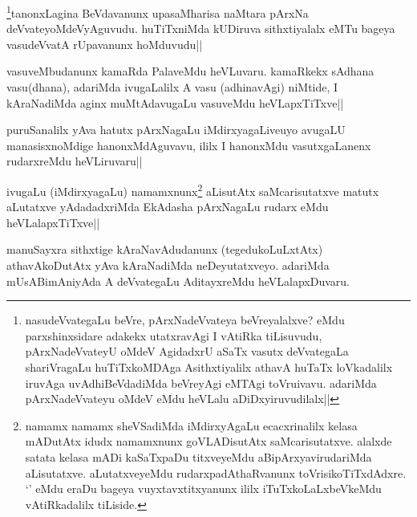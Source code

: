 \begin{artha}
\footnote[2]{nasudeVvategaLu beVre, pArxNadeVvateya beVreyalalxve? eMdu parxshinxsidare adakekx utatxravAgi I vAtiRka tiLisuvudu, pArxNadeVvateyU oMdeV AgidadxrU aSaTx vasutx deVvategaLa shariVragaLu huTiTxkoMDAga Asithxtiyalilx athavA huTaTx loVkadalilx iruvAga uvAdhiBeVdadiMda beVreyAgi eMTAgi toVruivavu. adariMda pArxNadeVvateyu oMdeV eMdu heVLalu aDiDxyiruvudilalx||}tanonxLagina BeVdavanunx upasaMharisa naMtara pArxNa deVvateyoMdeVyAguvudu. huTiTxniMda kUDiruva sithxtiyalalx eMTu bageya vasudeVvatA rUpavanunx hoMduvudu||
\end{artha}


\begin{artha}
vasuveMbudanunx kamaRda PalaveMdu heVLuvaru. kamaRkekx sAdhana vasu(dhana), adariMda ivugaLalilx A vasu (adhinavAgi) niMtide, I kAraNadiMda aginx muMtAdavugaLu vasuveMdu heVLapxTiTxve||
\end{artha}


\begin{artha}
puruSanalilx yAva hatutx pArxNagaLu iMdirxyagaLiveuyo avugaLU manasisxnoMdige hanonxMdAguvavu, ililx I hanonxMdu vasutxgaLanenx rudarxreMdu heVLiruvaru||
\end{artha}


\begin{artha}
ivugaLu (iMdirxyagaLu) namamxnunx\footnote[1]{namamx namamx sheVSadiMda iMdirxyAgaLu ecacxrinalilx kelasa mADutAtx idudx namamxnunx goVLADisutAtx saMcarisutatxve. alalxde satata kelasa mADi kaSaTxpaDu titxveyeMdu aBipArxyavirudariMda aLisutatxve. aLutatxveyeMdu rudarxpadAthaRvanunx toVrisikoTiTxdAdxre. `\stext ' eMdu eraDu bageya vuyxtavxtitxyanunx ililx iTuTxkoLaLxbeVkeMdu vAtiRkadalilx tiLiside.} aLisutAtx saMcarisutatxve matutx aLutatxve yAdadadxriMda EkAdasha pArxNagaLu rudarx eMdu heVLalapxTiTxve||
\end{artha}


\begin{artha}
manuSayxra sithxtige kAraNavAdudanunx (tegedukoLuLxtAtx) athavAkoDutAtx yAva kAraNadiMda neDeyutatxveyo. adariMda mUsABimAniyAda A deVvategaLu AditayxreMdu heVLalapxDuvaru.
\end{artha}%

